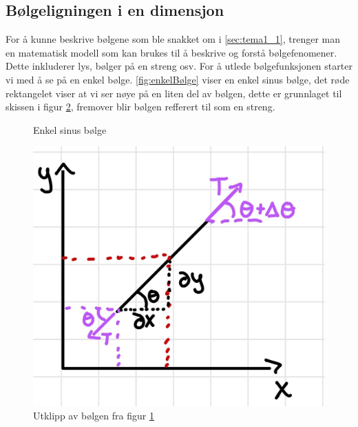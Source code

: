 \subsection{Bølgeligningen i en dimensjon}
\label{sec:tema1_2}
For å kunne beskrive bølgene som ble snakket om i \autoref{sec:tema1_1}, trenger man en matematisk modell som kan brukes til å beskrive og forstå bølgefenomener. Dette inkluderer lys, bølger på en streng osv. For å utlede bølgefunksjonen starter vi med å se på en enkel bølge. \autoref{fig:enkelBølge} viser en enkel sinus bølge, det røde rektangelet viser at vi ser nøye på en liten del av bølgen, dette er grunnlaget til skissen i figur \ref{fig:utledning_BL1D}, fremover blir bølgen refferert til som en streng.

\begin{figure}[!htb]
\caption{Enkel sinus bølge}
\label{fig:enkelBølge}
\end{figure}


\begin{figure}[!htb]
    \centering
    \includegraphics[scale=0.2]{Bilder/SamtaleTema1/utledning.jpeg}
    \caption{Utklipp av bølgen fra figur \ref{fig:enkelBølge}}
    \label{fig:utledning_BL1D}
\end{figure}


